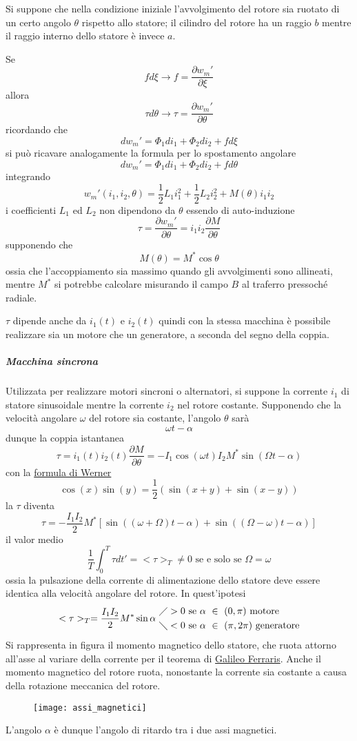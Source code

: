 Si suppone che nella condizione iniziale l'avvolgimento del rotore sia ruotato di un certo angolo
$\theta$ rispetto allo statore; il cilindro del rotore ha un raggio $b$ mentre il raggio interno dello 
statore è invece $a$.

Se
$$
fd\xi \rightarrow f = \frac{\partial w_m'}{\partial\xi}
$$
allora
$$
\tau d\theta \rightarrow \tau= \frac{\partial w_m'}{\partial \theta}
$$
ricordando che 
$$
dw_m' = \Phi_1di_1 + \Phi_2di_2 + fd\xi
$$
si può ricavare analogamente la formula per lo spostamento angolare
$$
dw_m' = \Phi_1di_1 + \Phi_2di_2 + fd\theta
$$
integrando
$$
w_m'(i_1,i_2,\theta) = \frac{1}{2}L_1i_1^2 +  \frac{1}{2}L_2i_2^2 + M(\theta)i_1i_2
$$
i coefficienti $L_1$ ed $L_2$ non dipendono da $\theta$ essendo di auto-induzione
$$
\tau = \frac{\partial w_m'}{\partial \theta} = i_1i_2\frac{\partial M}{\partial \theta}
$$
supponendo che 
$$
M(\theta) = M^*\cos\theta
$$
ossia che l'accoppiamento sia massimo quando gli avvolgimenti sono allineati, mentre $M^*$ si potrebbe
calcolare misurando il campo $B$ al traferro pressoché radiale.

$\tau$ dipende anche da $i_1(t)$ e $i_2(t)$ quindi con la stessa macchina è possibile realizzare
sia un motore che un generatore, a seconda del segno della coppia.

\subparagraph{Macchina sincrona} Utilizzata per realizzare motori sincroni o alternatori, si
suppone la corrente $i_1$ di statore sinusoidale mentre la corrente $i_2$ nel rotore costante.
Supponendo che la velocità angolare $\omega$ del rotore sia costante, l'angolo $\theta$ sarà
$$
\omega t - \alpha
$$
dunque la coppia istantanea 
$$
\tau = i_1(t)i_2(t) \frac{\partial M}{\partial \theta} = -I_1\cos\left(\omega t\right) I_2 M^* \sin\left(\Omega t - \alpha\right)
$$
con la \href{https://it.wikipedia.org/wiki/Formule_di_Werner}{formula di Werner}
$$
\cos\left(x\right)\sin\left(y\right) = \frac{1}{2}\left( \sin\left(x+y\right) + \sin\left(x-y\right) \right)
$$
la $\tau$ diventa
$$
\tau = -\frac{I_1I_2}{2}M^*\left[\sin\left(\left(\omega+\Omega\right)t - \alpha\right) +
\sin\left(\left(\Omega-\omega\right)t-\alpha\right)\right]
$$
il valor medio
$$
\frac{1}{T}\int_0^T \tau dt' = <\tau>_T \neq 0 \text{ se e solo se } \Omega = \omega
$$
ossia la pulsazione della corrente di alimentazione dello statore deve essere identica alla velocità angolare
del rotore. In quest'ipotesi
$$
<\tau>_T = \frac{I_1I_2}{2}M^*\sin\alpha \
\begin{aligned}
&\diagup > 0 \text{ se } \alpha \ \in\ (0,\pi) \text{ motore} \\
&\diagdown < 0 \text{ se } \alpha \ \in\ (\pi,2\pi) \text{ generatore}
\end{aligned}
$$
Si rappresenta in figura il momento magnetico dello statore, che ruota attorno all'asse al variare
della corrente per il teorema di \href{https://it.wikipedia.org/wiki/Campo_magnetico_alternato_e_rotante}{Galileo Ferraris}. Anche il momento magnetico del rotore ruota, nonostante la corrente sia costante a causa della
rotazione meccanica del rotore.
\begin{figure}[H]
\centering
\texttt{[image: assi\_magnetici]}
\end{figure}
L'angolo $\alpha$ è dunque l'angolo di ritardo tra i due assi magnetici.
